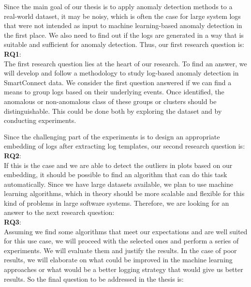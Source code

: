 Since the main goal of our thesis is to apply anomaly detection methods to a real-world dataset, it may be noisy, which is often the case for large system logs that were not intended as input to machine learning-based anomaly detection in the first place. 
We also need to find out if the logs are generated in a way that is suitable and sufficient for anomaly detection. Thus, our first research question is:\\

\textbf{RQ1}: \textit{\RQFirst}\\
    
The first research question lies at the heart of our research. To find an answer, we will develop and follow a methodology to study log-based anomaly detection in SmartConnect data. We consider the first question answered if we can find a means to group logs based on their underlying events. Once identified, the anomalous or non-anomalous class of these groups or clusters should be distinguishable. This could be done both by exploring the dataset and by conducting experiments.

Since the challenging part of the experiments is to design an appropriate embedding of logs after extracting log templates, our second research question is:\\ 


\textbf{RQ2}: \textit{\RQSecond}\\

If this is the case and we are able to detect the outliers in plots based on our embedding, it should be possible to find an algorithm that can do this task automatically. Since we have large datasets available, we plan to use machine learning algorithms, which in theory should be more scalable and flexible for this kind of problems in large software systems.
Therefore, we are looking for an answer to the next research question:\\


\textbf{RQ3}: \textit{\RQThird}\\
    
Assuming we find some algorithms that meet our expectations and are well suited for this use case, we will proceed with the selected ones and perform a series of experiments.
We will evaluate them and justify the results. In the case of poor results, we will elaborate on what could be improved in the machine learning approaches or what would be a better logging strategy that would give us better results.
So the final question to be addressed in the thesis is:\\

